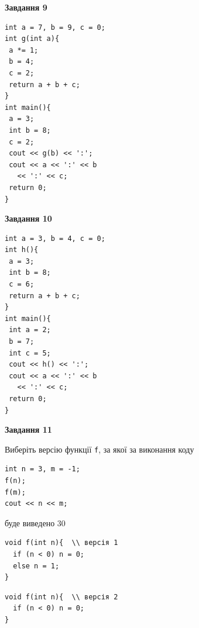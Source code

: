 \documentclass[12pt, ukrainian]{article}
\def\code#1{\Verb!#1!}
\begin{document}
{\begin {large}
\begin{minipage}[t]{11.0cm}
\end{minipage}


\begin{minipage}[t]{7.0cm}

\begin{center}
\textbf{Завдання 9}
\end{center}
\vspace{-8mm}

\begin{verbatim}
int a = 7, b = 9, c = 0;
int g(int a){
 a *= 1;
 b = 4;
 c = 2;
 return a + b + c;
}
int main(){
 a = 3;
 int b = 8;
 c = 2;
 cout << g(b) << ':';
 cout << a << ':' << b 
   << ':' << c;
 return 0;
}
\end{verbatim}



\begin{center}
\textbf{Завдання 10}
\end{center}
\vspace{-8mm}

\begin{verbatim}
int a = 3, b = 4, c = 0;
int h(){
 a = 3;
 int b = 8;
 c = 6;
 return a + b + c;
}
int main(){
 int a = 2;
 b = 7;
 int c = 5;
 cout << h() << ':';
 cout << a << ':' << b 
   << ':' << c;
 return 0;
}
\end{verbatim}

\end{minipage}
\vline \hspace{1mm}
\begin{minipage}[t]{11.0cm}

\begin{center}
\textbf{Завдання 11}
\end{center}
Виберіть версію функції \code{f}, за якої за виконання коду
\begin{verbatim}
int n = 3, m = -1;
f(n);
f(m);
cout << n << m;
\end{verbatim}

буде виведено 30

\begin{verbatim}
void f(int n){  \\ версія 1
  if (n < 0) n = 0;
  else n = 1;
}
\end{verbatim}

\vspace{-8mm}\begin{verbatim}
void f(int n){  \\ версія 2
  if (n < 0) n = 0;
}
\end{verbatim}


\end{minipage}
\end{large}}
\end{document}
